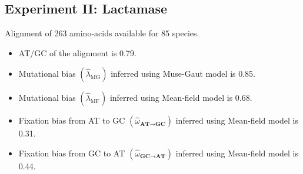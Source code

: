 \documentclass{article}
\begin{document}
	\subsection{Experiment II: Lactamase}
	Alignment of 263 amino-acids available for 85 species.
	\begin{itemize}
		\item AT/GC of the alignment is 0.79.
		\item Mutational bias $\left({\widehat{\lambda}_{\text{MG}}} \right)$ inferred using Muse-Gaut model is 0.85.
		\item Mutational bias $\left({\widehat{\lambda}_{\text{MF}}} \right)$ inferred using Mean-field model is 0.68.
		\item Fixation bias from AT to GC $\left(\widehat{\omega}_{\textbf{AT} \rightarrow \textbf{GC}}\right)$ inferred using Mean-field model is 0.31.
		\item Fixation bias from GC to AT $\left(\widehat{\omega}_{\textbf{GC} \rightarrow \textbf{AT}}\right)$ inferred using Mean-field model is 0.44.
	\end{itemize}

\end{document}
